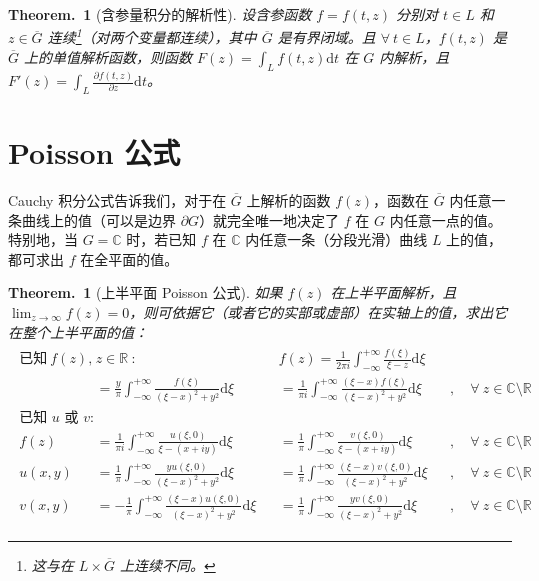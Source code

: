 \documentclass[UTF8]{report}
\def\R{\mathbb{R}}
\def\C{\mathbb{C}}
\theoremstyle{MyLineTheoremStyle} %
\theoremstyle{MyBlockTheoremStyle} %
\newtheorem{BlockTheorem}[LineTheorem]{Theorem.\,} %
\theoremstyle{MySubsubsectionStyle} %
\begin{document}
\begin{BlockTheorem}[含参量积分的解析性]\label{含参量积分的解析性}
设含参函数 $f = f(t,z)$ 分别对 $t\in L$ 和 $z\in \overline{G} $ 连续\footnote{这与在 $ L \times \overline{G}$ 上连续不同。}（对两个变量都连续），其中 $\overline{G} $ 是有界闭域。且 $\forall\ t \in L$，$f(t,z)$ 是 $\overline{G}$ 上的单值解析函数，则函数 $\displaystyle F(z) = \int_{L} f(t,z) \mathrm{d}t$
在 $G$ 内解析，且 $\displaystyle F'(z) =  \int_{L} \frac{\partial f(t,z) }{\partial z } \mathrm{d}t$。
\end{BlockTheorem}

\section{Poisson 公式}

Cauchy 积分公式告诉我们，对于在 $\overline{G} $ 上解析的函数 $f(z)$，函数在 $\overline{G} $ 内任意一条曲线上的值（可以是边界 $\partial G$）就完全唯一地决定了 $f$ 在 $G$ 内任意一点的值。特别地，当 $ G = \C$ 时，若已知 $f$ 在 $\C$ 内任意一条（分段光滑）曲线 $L$ 上的值，都可求出 $f$ 在全平面的值。

\begin{BlockTheorem}[上半平面 Poisson 公式]\label{上半平面 Poisson 公式}
如果 $f(z)$ 在上半平面解析，且 $\lim_{z \to \infty} f(z) = 0$，则可依据它（或者它的实部或虚部）在实轴上的值，求出它在整个上半平面的值：
\begin{gather}
    \begin{aligned}
        \text{已知}\ f(z),& z \in \R\ \text{:}  \quad \quad \quad 
        && f(z) 
        = \frac{1}{2 \pi i} \int_{-\infty}^{+ \infty} \frac{f(\xi)}{\xi - z} \mathrm{d}\xi \\ 
        &= \frac{y}{\pi} \int_{-\infty}^{+ \infty} \frac{f(\xi)}{(\xi - x)^2 + y^2} \mathrm{d}\xi 
        &&=  \frac{1}{\pi i} \int_{-\infty}^{+ \infty} \frac{ (\xi - x)f(\xi)}{(\xi - x)^2 + y^2} \mathrm{d}\xi &&,\quad \forall\ z \in \C \setminus \R
        \\
        \text{已知 $u$ 或 $v$: }& \\
        f(z) 
        &= \frac{1}{\pi i} \int_{-\infty}^{+ \infty} \frac{ u(\xi, 0) }{\xi - (x + iy)} \mathrm{d}\xi
        &&= \frac{1}{\pi} \int_{-\infty}^{+ \infty} \frac{ v(\xi, 0) }{\xi - (x + iy)} \mathrm{d}\xi  &&,\quad \forall\ z \in \C \setminus \R
        \\ 
        u(x,y) 
        &= \frac{1}{\pi} \int_{-\infty}^{+ \infty} \frac{ yu(\xi, 0)}{(\xi - x)^2 + y^2} \mathrm{d}\xi 
        &&= \frac{1}{\pi} \int_{-\infty}^{+ \infty} \frac{ (\xi - x)v(\xi, 0)}{(\xi - x)^2 + y^2} \mathrm{d}\xi  &&,\quad \forall\ z \in \C \setminus \R
        \\ 
        v(x,y) 
        &= - \frac{1}{\pi} \int_{-\infty}^{+ \infty} \frac{ (\xi - x)u(\xi, 0)}{(\xi - x)^2 + y^2} \mathrm{d}\xi 
        &&= \frac{1}{\pi} \int_{-\infty}^{+ \infty} \frac{ yv(\xi, 0)}{(\xi - x)^2 + y^2} \mathrm{d}\xi  &&,\quad \forall\ z \in \C \setminus \R
    \end{aligned}
    \end{gather}

\end{BlockTheorem}
\end{document}
